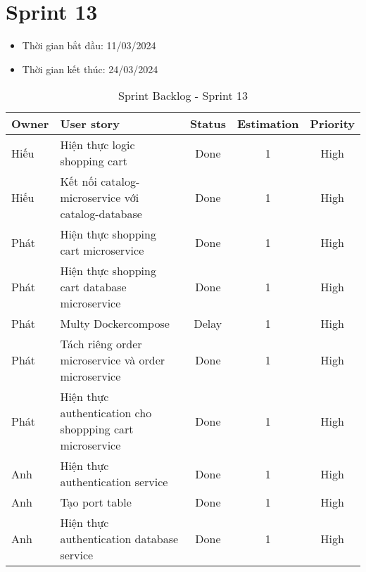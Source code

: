 \section{Sprint 13}
\begin{itemize}
    \item Thời gian bắt đầu: 11/03/2024
    \item Thời gian kết thúc: 24/03/2024
\end{itemize}
\begin{table}[H]
    \begin{tabular}{|m{2.5cm}|m{6cm}|c|c|c|}
    \hline
    \textbf{Owner}  & \textbf{User story}                                & \textbf{Status} & \textbf{Estimation} & \textbf{Priority} \\ \hline
    Hiếu                & Hiện thực logic shopping cart                    & Done            & 1                   & High         \\ \hline
    Hiếu               & Kết nối catalog-microservice với catalog-database                    & Done            & 1                   & High         \\ \hline
    Phát                & Hiện thực shopping cart microservice                   & Done            & 1                   & High         \\ \hline
    Phát               & Hiện thực shopping cart database microservice                     & Done            & 1                   & High         \\ \hline
    Phát               & Multy Dockercompose                     & Delay           & 1                   & High         \\ \hline
    Phát               & Tách riêng order microservice và order microservice                    & Done            & 1                   & High         \\ \hline
    Phát               & Hiện thực authentication cho shoppping cart microservice                     & Done            & 1                   & High         \\ \hline
    Anh               & Hiện thực authentication service                     & Done            & 1                   & High         \\ \hline
    Anh               & Tạo port table                     & Done            & 1                   & High         \\ \hline
    Anh               & Hiện thực authentication database service                    & Done            & 1                   & High         \\ \hline
    \end{tabular}
    \caption{Sprint Backlog - Sprint 13}
    \label{tab:sprint-13}
\end{table}
